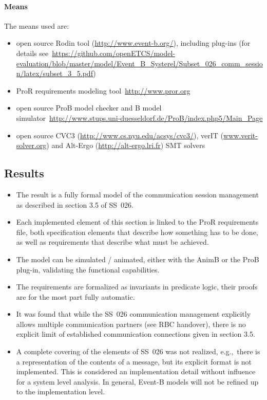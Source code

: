 \paragraph{Means}
\label{sec:means}

The means used are:
\begin{itemize}
\item open source Rodin tool (\url{http://www.event-b.org/}), including plug-ins
  (for details
  see~\url{https://github.com/openETCS/model-evaluation/blob/master/model/Event_B_Systerel/Subset_026_comm_session/latex/subset_3_5.pdf})
\item ProR requirements modeling tool~\url{http://www.pror.org}
\item open source ProB model checker and B model
  simulator~\url{http://www.stups.uni-duesseldorf.de/ProB/index.php5/Main_Page}
\item open source CVC3 (\url{http://www.cs.nyu.edu/acsys/cvc3/}), verIT
  (\url{www.verit-solver.org}) and Alt-Ergo (\url{http://alt-ergo.lri.fr}) SMT
  solvers
\end{itemize}



\subsection{Results}
\label{sec:results}

\begin{itemize}
\item The result is a fully formal model of the communication session management
  as described in section 3.5 of SS~026.
\item Each implemented element of this section is linked to the ProR
  requirements file, both specification elements that describe how something has
  to be done, as well as requirements that describe what must be achieved.
\item The model can be simulated / animated, either with the AnimB or the ProB
  plug-in, validating the functional capabilities.
\item The requirements are formalized as invariants in predicate logic, their
  proofs are for the most part fully automatic.
\item It was found that while the SS~026 communication management explicitly
  allows multiple communication partners (see RBC handover), there is no
  explicit limit of established communication connections given in section 3.5.
\item A complete covering of the elements of SS~026 was not realized, e.g.,\
  there is a representation of the contents of a message, but its explicit
  format is not implemented. This is considered an implementation detail without
  influence for a system level analysis. In general, Event-B models will not be
  refined up to the implementation level.
\end{itemize}

